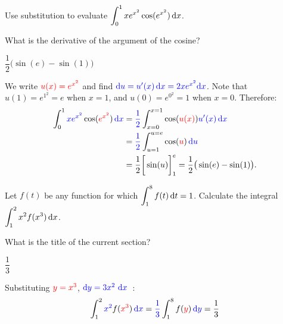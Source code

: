 \begin{question}[2016Q2]
Use substitution to evaluate $\displaystyle\int_{0}^{1} x e^{x^2} \cos (e^{x^2}) \,\mathrm{d}x$.
\end{question}

\begin{hint}
What is the derivative of the argument of the cosine?
\end{hint}

\begin{answer}
$\dfrac{1}{2}\big( \sin(e) - \sin(1) \big)$
\end{answer}

\begin{solution}
We write $\textcolor{red}{u(x) = e^{x^2}}$ and find $\textcolor{blue}{\mathrm{d}u = u'(x)\,\mathrm{d}x=2x e^{x^2}\mathrm{d}x}$. Note that $u(1)=e^{1^2}=e$ when $x=1$, and $u(0)=e^{0^2}=1$ when $x=0$. Therefore:
\begin{align*}
\int_{0}^{1} \textcolor{blue}{x e^{x^2}} \cos (\textcolor{red}{e^{x^2}}) \,\textcolor{blue}{\mathrm{d}x} &= \textcolor{blue}{\frac{1}{2}}\int_{x=0}^{x=1} \cos (\textcolor{red}{u(x)}) \textcolor{blue}{u'(x)\,\mathrm{d}x }\\
&=\textcolor{blue}{ \frac{1}{2}}\int_{u=1}^{u=e} \cos(\textcolor{red}u)\,\color{blue}\mathrm{d}u\\
&= \frac{1}{2}\bigg[\sin(u) \bigg]_1^e
= \frac{1}{2}\big( \sin(e) - \sin(1) \big).
\end{align*}
\end{solution}

\begin{question}[2001D]
Let $f(t)$ be any function for which $\displaystyle\int_1^8 f(t)\,\mathrm{d}t=1$.
Calculate the integral $\displaystyle\int_1^2 x^2 f(x^3)\,\mathrm{d}x$.
\end{question}

\begin{hint}
What is the title of the current section?
\end{hint}

\begin{answer}
$\dfrac{1}{3}$
\end{answer}

\begin{solution}
Substituting $\textcolor{red}{y=x^3}$, $\textcolor{blue}{\mathrm{d}y=3x^2\ \mathrm{d}x}$\ :
\begin{align*}
\int_1^2 \textcolor{blue}{x^2} f(\textcolor{red}{x^3})\,\textcolor{blue}{\mathrm{d}x}
=\textcolor{blue}{\frac{1}{3}}\int_1^8 f(\textcolor{red}{y})\,\textcolor{blue}{\mathrm{d}y}
=\frac{1}{3}
\end{align*}
\end{solution}

